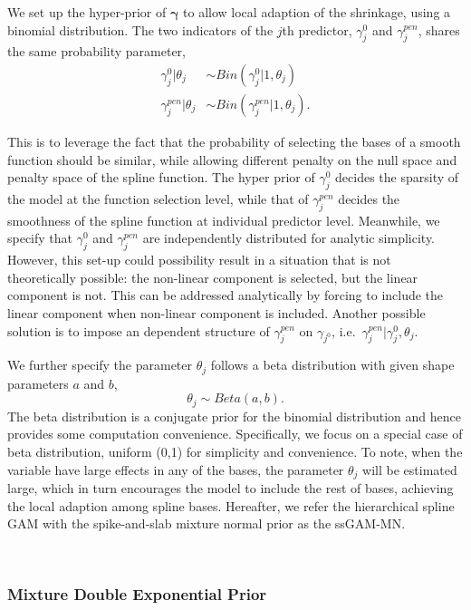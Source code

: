 \documentclass[AMA,STIX1COL,]{WileyNJD-v2}
\begin{document}
We set up the hyper-prior of \(\boldsymbol{\gamma}\) to allow local
adaption of the shrinkage, using a binomial distribution. The two
indicators of the \(j\)th predictor, \(\gamma^{0}_j\) and
\(\gamma^{pen}_j\), shares the same probability parameter, \[
\begin{aligned}
\gamma_{j}^{0} | \theta_j &\sim Bin(\gamma^{0}_{j}|1, \theta_j)\\
\gamma_{j}^{pen} | \theta_j &\sim Bin(\gamma^{pen}_{j}|1, \theta_j).
\end{aligned}
\]

This is to leverage the fact that the probability of selecting the bases
of a smooth function should be similar, while allowing different penalty
on the null space and penalty space of the spline function. The hyper
prior of \(\gamma_{j}^{0}\) decides the sparsity of the model at the
function selection level, while that of \(\gamma_{j}^{pen}\) decides the
smoothness of the spline function at individual predictor level.
Meanwhile, we specify that \(\gamma_{j}^0\) and \(\gamma_{j}^{pen}\) are
independently distributed for analytic simplicity. However, this set-up
could possibility result in a situation that is not theoretically
possible: the non-linear component is selected, but the linear component
is not. This can be addressed analytically by forcing to include the
linear component when non-linear component is included. Another possible
solution is to impose an dependent structure of \(\gamma_{j}^{pen}\) on
\(\gamma_{j^{0}}\), i.e.~\(\gamma_j^{pen}|\gamma_{j}^{0}, \theta_j\).

We further specify the parameter \(\theta_j\) follows a beta
distribution with given shape parameters \(a\) and \(b\), \[
\theta_j \sim Beta(a, b).
\] The beta distribution is a conjugate prior for the binomial
distribution and hence provides some computation convenience.
Specifically, we focus on a special case of beta distribution, uniform
(0,1) for simplicity and convenience. To note, when the variable have
large effects in any of the bases, the parameter \(\theta_j\) will be
estimated large, which in turn encourages the model to include the rest
of bases, achieving the local adaption among spline bases. Hereafter, we
refer the hierarchical spline GAM with the spike-and-slab mixture normal
prior as the ssGAM-MN.

~

\hypertarget{mixture-double-exponential-prior}{%
\subsubsection{Mixture Double Exponential
Prior}\label{mixture-double-exponential-prior}}
\end{document}

